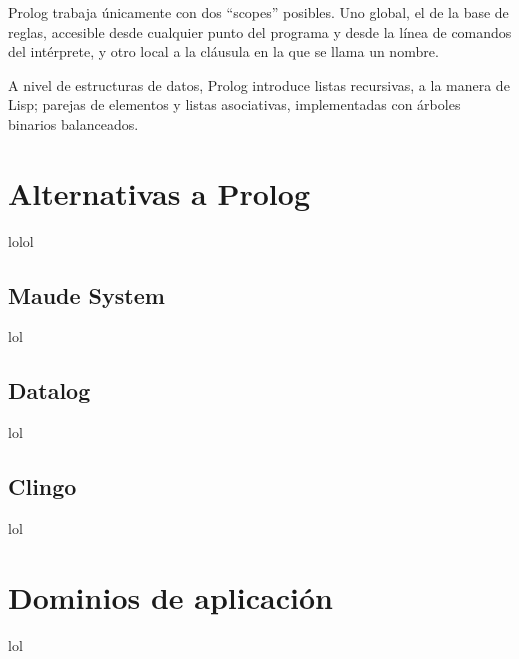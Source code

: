 \documentclass[11pt,captions=nooneline,DIV=14, parskip=full]{scrartcl}
\begin{document}
Prolog trabaja únicamente con dos ``scopes'' posibles. Uno global, el de la base de reglas, accesible desde cualquier punto del programa y desde la línea de comandos del intérprete, y otro local a la cláusula en la que se llama un nombre.

A nivel de estructuras de datos, Prolog introduce listas recursivas, a la manera de Lisp; parejas de elementos y listas asociativas, implementadas con árboles binarios balanceados.

\section{Alternativas a Prolog}
\label{sec:alt-prolog}
lolol

\subsection{Maude System}
lol

\subsection{Datalog}
lol

\subsection{Clingo}
lol

\section{Dominios de aplicación}
lol
\end{document}
